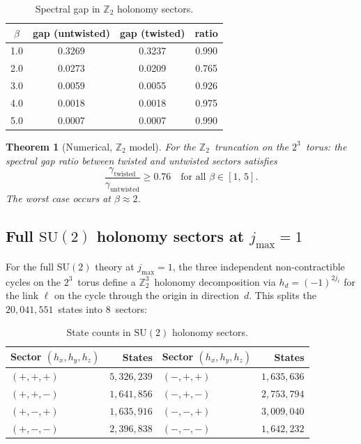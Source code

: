 \documentclass[12pt,a4paper]{article}
\newtheorem{theorem}{Theorem}[section]
\newcommand{\Z}{\mathbb{Z}}
\begin{document}
\begin{table}[h]
\centering
\caption{Spectral gap in $\Z_2$ holonomy sectors.}
\label{tab:twist}
\begin{tabular}{@{}cccc@{}}
\toprule
$\beta$ & gap (untwisted) & gap (twisted) & ratio \\
\midrule
1.0 & 0.3269 & 0.3237 & 0.990 \\
2.0 & 0.0273 & 0.0209 & 0.765 \\
3.0 & 0.0059 & 0.0055 & 0.926 \\
4.0 & 0.0018 & 0.0018 & 0.975 \\
5.0 & 0.0007 & 0.0007 & 0.990 \\
\bottomrule
\end{tabular}
\end{table}

\begin{theorem}[Numerical, $\Z_2$ model]\label{thm:BC}
For the $\Z_2$~truncation on the $2^3$~torus: the spectral gap ratio between twisted and untwisted sectors satisfies
\begin{equation}
\frac{\gamma_{\mathrm{twisted}}}{\gamma_{\mathrm{untwisted}}} \ge 0.76 \quad \text{for all } \beta\in[1,\,5].
\end{equation}
The worst case occurs at $\beta\approx 2$.
\end{theorem}

\subsection{Full $\mathrm{SU}(2)$ holonomy sectors at $j_{\max}=1$}

For the full $\mathrm{SU}(2)$ theory at $j_{\max}=1$, the three independent non-contractible cycles on the $2^3$~torus define a $\Z_2^3$~holonomy decomposition via $h_d=(-1)^{2j_\ell}$ for the link $\ell$ on the cycle through the origin in direction~$d$. This splits the $20{,}041{,}551$~states into 8~sectors:

\begin{table}[h]
\centering
\caption{State counts in $\mathrm{SU}(2)$ holonomy sectors.}
\label{tab:sectors}
\begin{tabular}{@{}lrlr@{}}
\toprule
Sector $(h_x,h_y,h_z)$ & States & Sector $(h_x,h_y,h_z)$ & States \\
\midrule
$(+,+,+)$ & $5{,}326{,}239$ & $(-,+,+)$ & $1{,}635{,}636$ \\
$(+,+,-)$ & $1{,}641{,}856$ & $(-,+,-)$ & $2{,}753{,}794$ \\
$(+,-,+)$ & $1{,}635{,}916$ & $(-,-,+)$ & $3{,}009{,}040$ \\
$(+,-,-)$ & $2{,}396{,}838$ & $(-,-,-)$ & $1{,}642{,}232$ \\
\bottomrule
\end{tabular}
\end{table}
\end{document}
